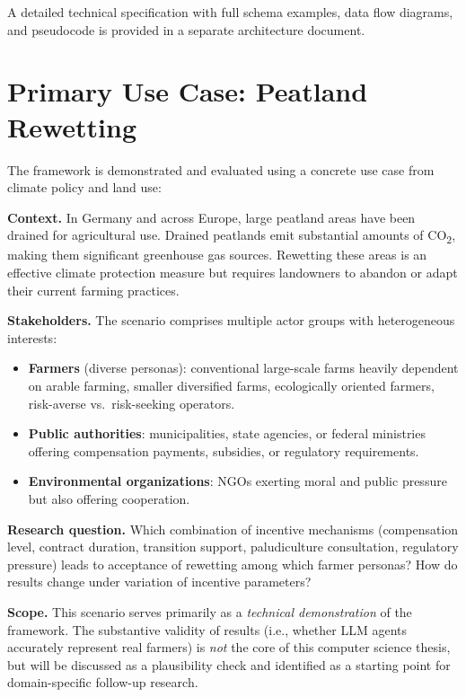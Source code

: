 \documentclass[12pt, a4paper]{article}
\begin{document}
A detailed technical specification with full schema examples, data flow diagrams, and pseudocode is provided in a separate architecture document.

\section{Primary Use Case: Peatland Rewetting}
\label{sec:usecase}

The framework is demonstrated and evaluated using a concrete use case from climate policy and land use:

\textbf{Context.} In Germany and across Europe, large peatland areas have been drained for agricultural use. Drained peatlands emit substantial amounts of CO\textsubscript{2}, making them significant greenhouse gas sources. Rewetting these areas is an effective climate protection measure but requires landowners to abandon or adapt their current farming practices.

\textbf{Stakeholders.} The scenario comprises multiple actor groups with heterogeneous interests:
\begin{itemize}
    \item \textbf{Farmers} (diverse personas): conventional large-scale farms heavily dependent on arable farming, smaller diversified farms, ecologically oriented farmers, risk-averse vs.\ risk-seeking operators.
    \item \textbf{Public authorities}: municipalities, state agencies, or federal ministries offering compensation payments, subsidies, or regulatory requirements.
    \item \textbf{Environmental organizations}: NGOs exerting moral and public pressure but also offering cooperation.
\end{itemize}

\textbf{Research question.} Which combination of incentive mechanisms (compensation level, contract duration, transition support, paludiculture consultation, regulatory pressure) leads to acceptance of rewetting among which farmer personas? How do results change under variation of incentive parameters?

\textbf{Scope.} This scenario serves primarily as a \textit{technical demonstration} of the framework. The substantive validity of results (i.e., whether LLM agents accurately represent real farmers) is \textit{not} the core of this computer science thesis, but will be discussed as a plausibility check and identified as a starting point for domain-specific follow-up research.
\end{document}
